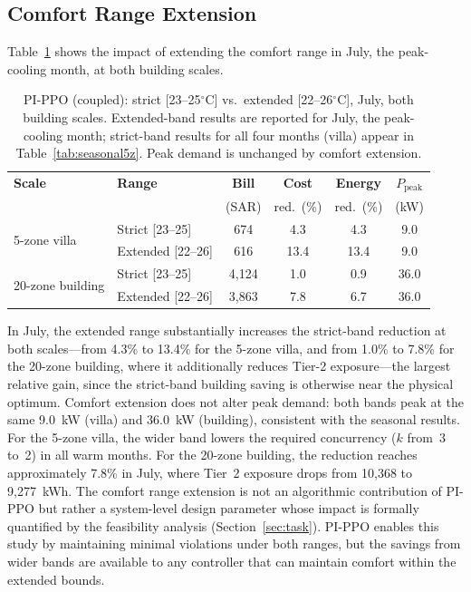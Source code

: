 \documentclass[12pt,a4paper]{article}
\begin{document}
\subsection{Comfort Range Extension}

Table~\ref{tab:comfort} shows the impact of extending the comfort range in July, the peak-cooling month, at both building scales.

\begin{table}[H]
\centering
\caption{PI-PPO (coupled): strict [23--25$^\circ$C] vs.\ extended [22--26$^\circ$C], July, both building scales. Extended-band results are reported for July, the peak-cooling month; strict-band results for all four months (villa) appear in Table~\ref{tab:seasonal5z}. Peak demand is unchanged by comfort extension.}
\label{tab:comfort}
\begin{tabular*}{\textwidth}{@{\extracolsep{\fill}}llcccc@{}}
\toprule
\textbf{Scale} & \textbf{Range} & \textbf{Bill} & \textbf{Cost} & \textbf{Energy} & $P_{\text{peak}}$ \\
 & & (SAR) & red.\ (\%) & red.\ (\%) & (kW) \\
\midrule
\multirow{2}{*}{5-zone villa}
 & Strict [23--25] & 674 & 4.3 & 4.3 & 9.0 \\
 & Extended [22--26] & 616 & 13.4 & 13.4 & 9.0 \\
\midrule
\multirow{2}{*}{20-zone building}
 & Strict [23--25] & 4{,}124 & 1.0 & 0.9 & 36.0 \\
 & Extended [22--26] & 3{,}863 & 7.8 & 6.7 & 36.0 \\
\bottomrule
\end{tabular*}
\end{table}

In July, the extended range substantially increases the strict-band reduction at both scales---from 4.3\% to 13.4\% for the 5-zone villa, and from 1.0\% to 7.8\% for the 20-zone building, where it additionally reduces Tier-2 exposure---the largest relative gain, since the strict-band building saving is otherwise near the physical optimum. Comfort extension does not alter peak demand: both bands peak at the same 9.0~kW (villa) and 36.0~kW (building), consistent with the seasonal results. For the 5-zone villa, the wider band lowers the required concurrency ($k$ from~3 to~2) in all warm months. For the 20-zone building, the reduction reaches approximately 7.8\% in July, where Tier~2 exposure drops from 10{,}368 to 9{,}277~kWh. The comfort range extension is not an algorithmic contribution of PI-PPO but rather a system-level design parameter whose impact is formally quantified by the feasibility analysis (Section~\ref{sec:task}). PI-PPO enables this study by maintaining minimal violations under both ranges, but the savings from wider bands are available to any controller that can maintain comfort within the extended bounds.
\end{document}
